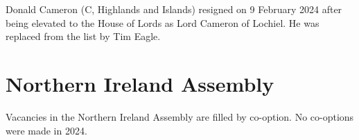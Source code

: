 \documentclass[a4paper,openany]{book}
\begin{document}
%
Donald Cameron (C, Highlands and Islands) resigned on 9 February 2024 after being elevated to the House of Lords as Lord Cameron of Lochiel.  He was replaced from the list by Tim Eagle.
%

\section{Northern Ireland Assembly}

Vacancies in the Northern Ireland Assembly are filled by co-option.
No co-options were made in 2024.
%
\end{document}
